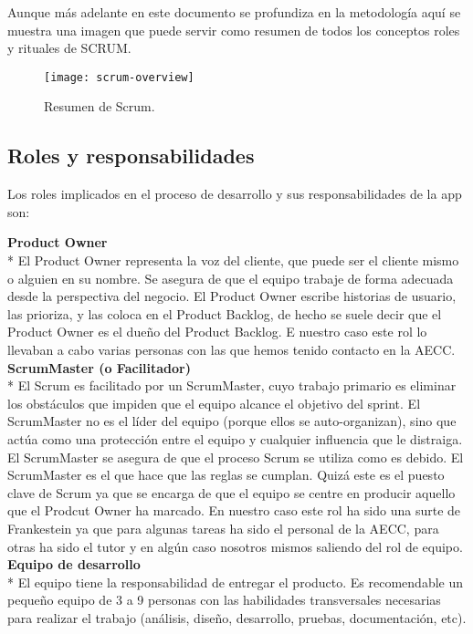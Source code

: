 \documentclass[../pfc.tex]{subfiles}
\begin{document}
	Aunque más adelante en este documento se profundiza en la metodología aquí se muestra una imagen que puede servir como resumen de todos los conceptos roles y rituales de SCRUM.
	
		\begin{figure}[h]
			\centering
			\texttt{[image: scrum-overview]}
			\caption{Resumen de Scrum.}
			\label{fig:Resumen de Scrum}
		\end{figure}
	
	\subsection{Roles y responsabilidades}
	Los roles  implicados en el proceso de desarrollo y sus responsabilidades   de la app son:

	\textbf{Product Owner}\\*
	El Product Owner representa la voz del cliente, que puede ser el cliente mismo o alguien en su nombre. Se asegura de que el equipo trabaje de forma adecuada desde la perspectiva del negocio. El Product Owner escribe historias de usuario, las prioriza, y las coloca en el Product Backlog, de hecho se suele decir que el Product Owner es el dueño del Product Backlog. E nuestro caso este rol lo llevaban a cabo varias personas con las que hemos tenido contacto en la AECC.\\
	
	\textbf{ScrumMaster (o Facilitador)}\\*
	El Scrum es facilitado por un ScrumMaster, cuyo trabajo primario es eliminar los obstáculos que impiden que el equipo alcance el objetivo del sprint. El ScrumMaster no es el líder del equipo (porque ellos se auto-organizan), sino que actúa como una protección entre el equipo y cualquier influencia que le distraiga. El ScrumMaster se asegura de que el proceso Scrum se utiliza como es debido. El ScrumMaster es el que hace que las reglas se cumplan. Quizá este es el puesto clave de Scrum ya que se encarga de que el equipo se centre en producir aquello que el Prodcut Owner ha marcado. En nuestro caso este rol ha sido una surte de Frankestein ya que para algunas tareas ha sido el personal de la AECC, para otras ha sido el tutor y en algún caso nosotros mismos saliendo del rol de equipo. \\
	
	\textbf{Equipo de desarrollo}\\*
	El equipo tiene la responsabilidad de entregar el producto. Es recomendable un pequeño equipo de 3 a 9 personas con las habilidades transversales necesarias para realizar el trabajo (análisis, diseño, desarrollo, pruebas, documentación, etc).\\
	
\end{document}
